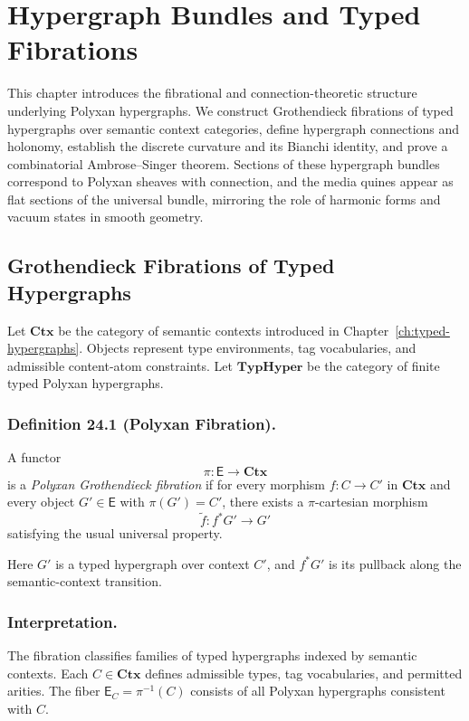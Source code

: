 \chapter{Hypergraph Bundles and Typed Fibrations}
\label{ch:hypergraph-fibrations}

This chapter introduces the fibrational and connection-theoretic structure
underlying Polyxan hypergraphs.  
We construct Grothendieck fibrations of typed hypergraphs over semantic
context categories, define hypergraph connections and holonomy, establish
the discrete curvature and its Bianchi identity, and prove a combinatorial
Ambrose--Singer theorem.  
Sections of these hypergraph bundles correspond to Polyxan sheaves with
connection, and the media quines appear as flat sections of the universal bundle,
mirroring the role of harmonic forms and vacuum states in smooth geometry.

\section{Grothendieck Fibrations of Typed Hypergraphs}

Let $\mathbf{Ctx}$ be the category of semantic contexts introduced in
Chapter~\ref{ch:typed-hypergraphs}.  
Objects represent type environments, tag vocabularies, and admissible
content-atom constraints.  
Let $\mathbf{TypHyper}$ be the category of finite typed Polyxan hypergraphs.

\subsection*{Definition 24.1 (Polyxan Fibration).}
A functor
\[
\pi : \mathsf{E} \to \mathbf{Ctx}
\]
is a \emph{Polyxan Grothendieck fibration} if for every morphism
$f : C \to C'$ in $\mathbf{Ctx}$ and every object $G' \in \mathsf{E}$ with
$\pi(G') = C'$, there exists a $\pi$-cartesian morphism
\[
\widetilde{f} : f^\ast G' \to G'
\]
satisfying the usual universal property.

Here $G'$ is a typed hypergraph over context $C'$, and
$f^\ast G'$ is its pullback along the semantic-context transition.

\subsection*{Interpretation.}
The fibration classifies families of typed hypergraphs indexed by semantic
contexts.  
Each $C \in \mathbf{Ctx}$ defines admissible types, tag vocabularies,
and permitted arities.  
The fiber $\mathsf{E}_C = \pi^{-1}(C)$ consists of all Polyxan hypergraphs
consistent with $C$.

